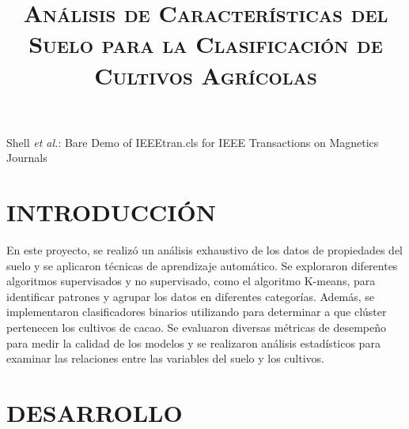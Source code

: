 \documentclass[journal,transmag]{IEEEtran}
\begin{document}
\title{\textsc{Análisis de Características del Suelo para la Clasificación de Cultivos Agrícolas}}

\author{


}
%
{Shell \MakeLowercase{\textit{et al.}}: Bare Demo of IEEEtran.cls for IEEE Transactions on Magnetics Journals}

\maketitle
\IEEEdisplaynontitleabstractindextext
\IEEEpeerreviewmaketitle

\section{INTRODUCCIÓN}
En este proyecto, se realizó un análisis exhaustivo de los datos de propiedades del suelo y se aplicaron técnicas de aprendizaje automático. Se exploraron diferentes algoritmos supervisados y no supervisado, como el algoritmo K-means, para identificar patrones y agrupar los datos en diferentes categorías. Además, se implementaron clasificadores binarios utilizando para determinar a que clúster pertenecen los cultivos de cacao. Se evaluaron diversas métricas de desempeño para medir la calidad de los modelos y se realizaron análisis estadísticos para examinar las relaciones entre las variables del suelo y los cultivos.

\section{DESARROLLO}
\end{document}
